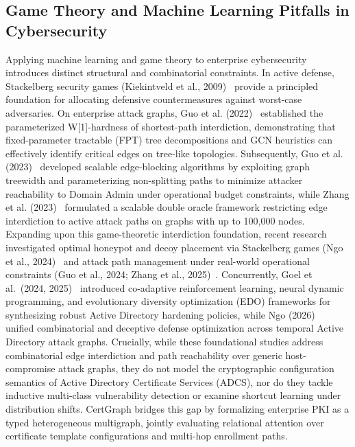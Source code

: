\subsection{Game Theory and Machine Learning Pitfalls in Cybersecurity}
Applying machine learning and game theory to enterprise cybersecurity introduces distinct structural and combinatorial constraints. In active defense, Stackelberg security games (Kiekintveld et al., 2009)~\cite{kiekintveld2009computing} provide a principled foundation for allocating defensive countermeasures against worst-case adversaries. On enterprise attack graphs, Guo et al. (2022)~\cite{guo2022practical} established the parameterized W[1]-hardness of shortest-path interdiction, demonstrating that fixed-parameter tractable (FPT) tree decompositions and GCN heuristics can effectively identify critical edges on tree-like topologies. Subsequently, Guo et al. (2023)~\cite{guo2023scalable} developed scalable edge-blocking algorithms by exploiting graph treewidth and parameterizing non-splitting paths to minimize attacker reachability to Domain Admin under operational budget constraints, while Zhang et al. (2023)~\cite{zhang2023scalable} formulated a scalable double oracle framework restricting edge interdiction to active attack paths on graphs with up to 100,000 nodes. Expanding upon this game-theoretic interdiction foundation, recent research investigated optimal honeypot and decoy placement via Stackelberg games (Ngo et al., 2024)~\cite{ngo2024catch,ngo2024decoy} and attack path management under real-world operational constraints (Guo et al., 2024; Zhang et al., 2025)~\cite{guo2024limited,zhang2025rethinking}. Concurrently, Goel et al.~(2024, 2025)~\cite{goel2024optimizing,goel2024hardening,goel2025coevolutionary} introduced co-adaptive reinforcement learning, neural dynamic programming, and evolutionary diversity optimization (EDO) frameworks for synthesizing robust Active Directory hardening policies, while Ngo (2026)~\cite{ngo2026practical} unified combinatorial and deceptive defense optimization across temporal Active Directory attack graphs. Crucially, while these foundational studies address combinatorial edge interdiction and path reachability over generic host-compromise attack graphs, they do not model the cryptographic configuration semantics of Active Directory Certificate Services (ADCS), nor do they tackle inductive multi-class vulnerability detection or examine shortcut learning under distribution shifts. CertGraph bridges this gap by formalizing enterprise PKI as a typed heterogeneous multigraph, jointly evaluating relational attention over certificate template configurations and multi-hop enrollment paths.

